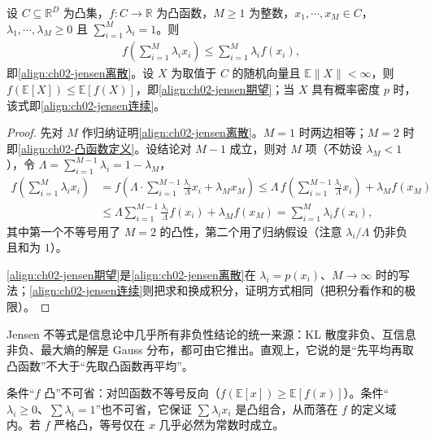 \documentclass[../../main.tex]{subfiles}
\begin{document}
\begin{theorem}\label{theorem:ch02-jensen}
设 $C\subseteq\mathbb{R}^{D}$ 为凸集，$f:C\to\mathbb{R}$ 为凸函数，$M\geqslant1$ 为整数，$x_1,\cdots,x_M\in C$，$\lambda_1,\cdots,\lambda_M\geqslant0$ 且 $\sum_{i=1}^{M}\lambda_i=1$。则
\begin{align*}
  f\left(\sum_{i=1}^{M}\lambda_i x_i\right)\leqslant\sum_{i=1}^{M}\lambda_i f(x_i),
\end{align*}
即\eqref{align:ch02-jensen离散}。设 $X$ 为取值于 $C$ 的随机向量且 $\mathbb{E}\|X\|<\infty$，则 $f(\mathbb{E}[X])\leqslant\mathbb{E}[f(X)]$，即\eqref{align:ch02-jensen期望}；当 $X$ 具有概率密度 $p$ 时，该式即\eqref{align:ch02-jensen连续}。
\end{theorem}

\begin{proof}
先对 $M$ 作归纳证明\eqref{align:ch02-jensen离散}。$M=1$ 时两边相等；$M=2$ 时即\eqref{align:ch02-凸函数定义}。设结论对 $M-1$ 成立，则对 $M$ 项（不妨设 $\lambda_M<1$），令 $\Lambda=\sum_{i=1}^{M-1}\lambda_i=1-\lambda_M$，
\begin{align*}
  f\left(\sum_{i=1}^{M}\lambda_ix_i\right)
  &= f\left(\Lambda\cdot\sum_{i=1}^{M-1}\frac{\lambda_i}{\Lambda}x_i + \lambda_Mx_M\right)
  \leqslant \Lambda\,f\left(\sum_{i=1}^{M-1}\frac{\lambda_i}{\Lambda}x_i\right) + \lambda_Mf(x_M) \\
  &\leqslant \Lambda\sum_{i=1}^{M-1}\frac{\lambda_i}{\Lambda}f(x_i) + \lambda_Mf(x_M)
  = \sum_{i=1}^{M}\lambda_if(x_i) ,
\end{align*}
其中第一个不等号用了 $M=2$ 的凸性，第二个用了归纳假设（注意 $\lambda_i/\Lambda$ 仍非负且和为 $1$）。

\eqref{align:ch02-jensen期望}是\eqref{align:ch02-jensen离散}在 $\lambda_i=p(x_i)$、$M\to\infty$ 时的写法；\eqref{align:ch02-jensen连续}则把求和换成积分，证明方式相同（把积分看作和的极限）。
\end{proof}

\begin{remark}
Jensen 不等式是信息论中几乎所有非负性结论的统一来源：KL 散度非负、互信息非负、最大熵的解是 Gauss 分布，都可由它推出。直观上，它说的是“先平均再取凸函数”不大于“先取凸函数再平均”。

条件“$f$ 凸”不可省：对凹函数不等号反向（$f(\mathbb{E}[x])\geqslant\mathbb{E}[f(x)]$）。条件“$\lambda_i\geqslant0$、$\sum\lambda_i=1$”也不可省，它保证 $\sum\lambda_ix_i$ 是凸组合，从而落在 $f$ 的定义域内。若 $f$ 严格凸，等号仅在 $x$ 几乎必然为常数时成立。
\end{remark}
\end{document}
